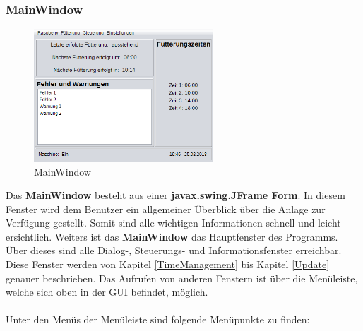 \newpage

\subsubsection{MainWindow}\label{subsubsec:MainWindow}
\begin{figure}
\vspace{-20pt}
  \begin{center}
    \includegraphics[width=0.60\textwidth]{Bilder/GUI/MainWindow}
  \end{center}
  \caption{MainWindow}
  \label{MainWindow}
  \vspace{20pt}
\end{figure}
Das \textbf{MainWindow} besteht aus einer \textbf{javax.swing.JFrame Form}. In diesem Fenster wird dem Benutzer ein allgemeiner Überblick über die Anlage zur Verfügung gestellt. Somit sind alle wichtigen Informationen schnell und leicht ersichtlich. Weiters ist das \textbf{MainWindow} das Hauptfenster des Programms. Über dieses sind alle Dialog-, Steuerungs- und Informationsfenster erreichbar. Diese Fenster werden von Kapitel \ref{TimeManagement} bis Kapitel \ref{Update} genauer beschrieben. Das Aufrufen von anderen Fenstern ist über die Menüleiste, welche sich oben in der \ac{GUI} befindet, möglich. 
\\ \\ Unter den Menüs der Menüleiste sind folgende Menüpunkte zu finden:
